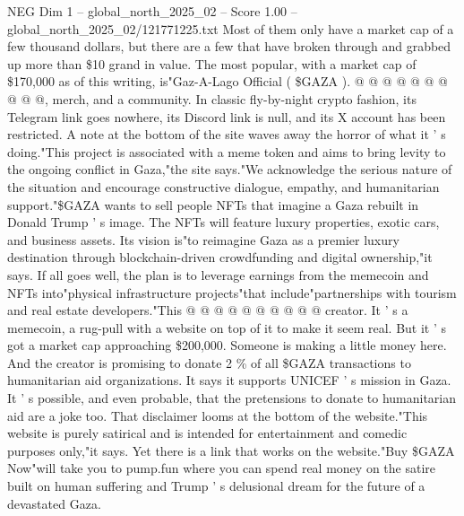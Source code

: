 \begin{textsample}{NEG Dim 1 – global\_north\_2025\_02 – Score 1.00 – global\_north\_2025\_02/121771225.txt}
Most of them only have a market cap of a few thousand dollars, but there are a few that have broken through and grabbed up more than \$10 grand in value.
The most popular, with a market cap of \$170,000 as of this writing, is"Gaz-A-Lago Official ( \$GAZA ). @ @ @ @ @ @ @ @ @ @, merch, and a community.
In classic fly-by-night crypto fashion, its Telegram link goes nowhere, its Discord link is null, and its X account has been restricted.
A note at the bottom of the site waves away the horror of what it ' s doing."This project is associated with a meme token and aims to bring levity to the ongoing conflict in Gaza,"the site says."We acknowledge the serious nature of the situation and encourage constructive dialogue, empathy, and humanitarian support."\$GAZA wants to sell people NFTs that imagine a Gaza rebuilt in Donald Trump ' s image.
The NFTs will feature luxury properties, exotic cars, and business assets.
Its vision is"to reimagine Gaza as a premier luxury destination through blockchain-driven crowdfunding and digital ownership,"it says.
If all goes well, the plan is to leverage earnings from the memecoin and NFTs into"physical infrastructure projects"that include"partnerships with tourism and real estate developers."This @ @ @ @ @ @ @ @ @ @ creator.
It ' s a memecoin, a rug-pull with a website on top of it to make it seem real.
But it ' s got a market cap approaching \$200,000.
Someone is making a little money here.
And the creator is promising to donate 2 \% of all \$GAZA transactions to humanitarian aid organizations.
It says it supports UNICEF ' s mission in Gaza.
It ' s possible, and even probable, that the pretensions to donate to humanitarian aid are a joke too.
That disclaimer looms at the bottom of the website."This website is purely satirical and is intended for entertainment and comedic purposes only,"it says.
Yet there is a link that works on the website."Buy \$GAZA Now"will take you to pump.fun where you can spend real money on the satire built on human suffering and Trump ' s delusional dream for the future of a devastated Gaza.

\end{textsample}
